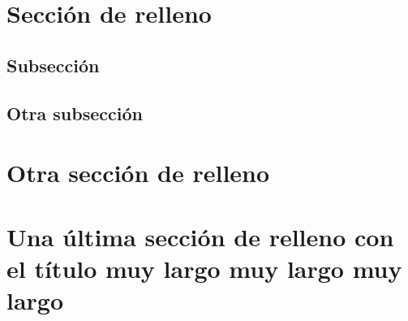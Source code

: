 \documentclass[12pt,a4paper,twoside]{article}
\begin{document}
\section{Sección de relleno}

\lipsum[1-15]

\subsection{Subsección}

\lipsum[1-15]

\subsection{Otra subsección}

\lipsum[1-15]		

\section{Otra sección de relleno}

\lipsum[1-15]		

\section{Una última sección de relleno con el título muy largo muy largo muy largo}

\lipsum[1-15]
\end{document}
